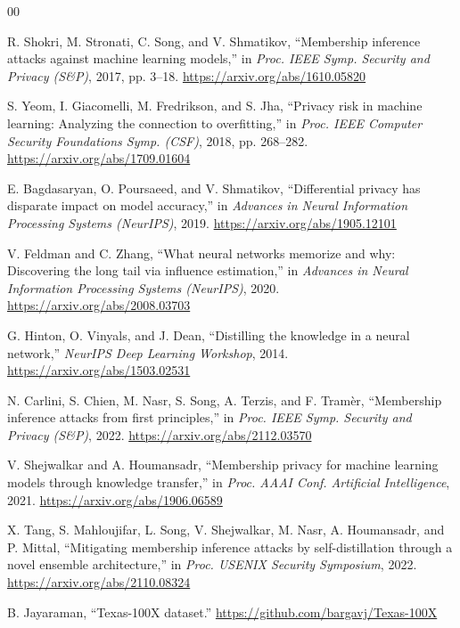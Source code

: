 \documentclass[conference]{IEEEtran}
\begin{document}
\begin{thebibliography}{00}

 R. Shokri, M. Stronati, C. Song, and V. Shmatikov, ``Membership inference attacks against machine learning models,'' in \emph{Proc. IEEE Symp. Security and Privacy (S\&P)}, 2017, pp. 3--18. \url{https://arxiv.org/abs/1610.05820}

 S. Yeom, I. Giacomelli, M. Fredrikson, and S. Jha, ``Privacy risk in machine learning: Analyzing the connection to overfitting,'' in \emph{Proc. IEEE Computer Security Foundations Symp. (CSF)}, 2018, pp. 268--282. \url{https://arxiv.org/abs/1709.01604}

 E. Bagdasaryan, O. Poursaeed, and V. Shmatikov, ``Differential privacy has disparate impact on model accuracy,'' in \emph{Advances in Neural Information Processing Systems (NeurIPS)}, 2019. \url{https://arxiv.org/abs/1905.12101}

 V. Feldman and C. Zhang, ``What neural networks memorize and why: Discovering the long tail via influence estimation,'' in \emph{Advances in Neural Information Processing Systems (NeurIPS)}, 2020. \url{https://arxiv.org/abs/2008.03703}

 G. Hinton, O. Vinyals, and J. Dean, ``Distilling the knowledge in a neural network,'' \emph{NeurIPS Deep Learning Workshop}, 2014. \url{https://arxiv.org/abs/1503.02531}

 N. Carlini, S. Chien, M. Nasr, S. Song, A. Terzis, and F. Tram\`er, ``Membership inference attacks from first principles,'' in \emph{Proc. IEEE Symp. Security and Privacy (S\&P)}, 2022. \url{https://arxiv.org/abs/2112.03570}

 V. Shejwalkar and A. Houmansadr, ``Membership privacy for machine learning models through knowledge transfer,'' in \emph{Proc. AAAI Conf. Artificial Intelligence}, 2021. \url{https://arxiv.org/abs/1906.06589}

 X. Tang, S. Mahloujifar, L. Song, V. Shejwalkar, M. Nasr, A. Houmansadr, and P. Mittal, ``Mitigating membership inference attacks by self-distillation through a novel ensemble architecture,'' in \emph{Proc. USENIX Security Symposium}, 2022. \url{https://arxiv.org/abs/2110.08324}

 B. Jayaraman, ``Texas-100X dataset.'' \url{https://github.com/bargavj/Texas-100X}

\end{thebibliography}
\end{document}
